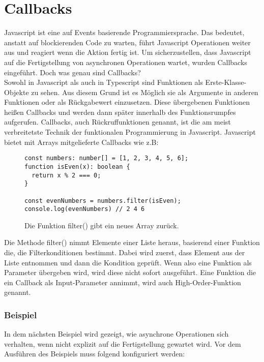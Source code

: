 \section{Callbacks}
Javascript ist eine auf Events basierende Programmiersprache. Das bedeutet, anstatt auf blockierenden Code zu warten, führt Javascript Operationen weiter aus und reagiert wenn die Aktion fertig ist. Um sicherzustellen, dass Javascript auf die Fertigstellung von asynchronen Operationen wartet, wurden Callbacks eingeführt. Doch was genau sind Callbacks? \\

\noindent
Sowohl in Javascript als auch in Typescript sind Funktionen als Erste-Klasse-Objekte zu sehen. Aus diesem Grund ist es Möglich sie als Argumente in anderen Funktionen oder als Rückgabewert einzusetzen. Diese übergebenen Funktionen heißen Callbacks und werden dann \glqq{}später\grqq{} innerhalb des Funktionsrumpfes aufgerufen. Callbacks, auch Rückruffunktionen genannt, ist die am meist verbreitetste Technik der funktionalen Programmierung in Javascript.\cite{callbacks-intro} Javascript bietet mit Arrays mitgelieferte Callbacks wie z.B:

\begin{figure}[H]
\begin{lstlisting}
const numbers: number[] = [1, 2, 3, 4, 5, 6];
function isEven(x): boolean { 
  return x % 2 === 0; 
}

const evenNumbers = numbers.filter(isEven);
console.log(evenNumbers) // 2 4 6
\end{lstlisting}
\caption{Die Funktion filter() gibt ein neues Array zurück.\cite{callbacks-example}}
\end{figure}

\noindent
Die Methode filter() nimmt Elemente einer Liste heraus, basierend einer Funktion die, die Filterkonditionen bestimmt. Dabei wird zuerst, dass Element aus der Liste entnommen und dann die Kondition geprüft. Wenn also eine Funktion als Parameter übergeben wird, wird diese nicht sofort ausgeführt. Eine Funktion die ein Callback als Input-Parameter annimmt, wird auch High-Order-Funktion genannt.

\subsubsection{Beispiel}

In dem nächsten Beispiel wird gezeigt, wie asynchrone Operationen sich verhalten, wenn nicht explizit auf die Fertigstellung gewartet wird. Vor dem Ausführen des Beispiels muss folgend konfiguriert werden:

